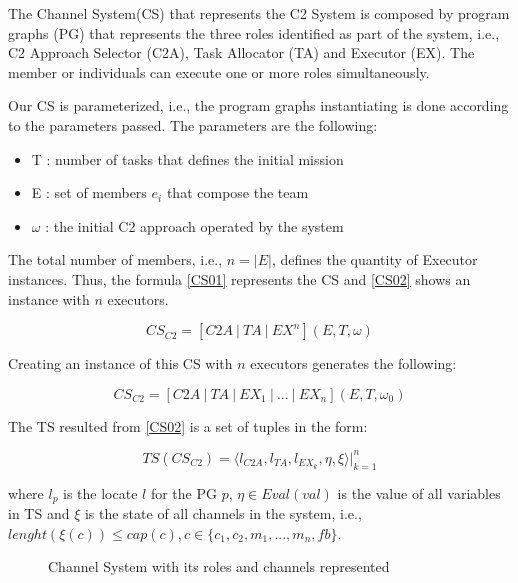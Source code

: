 The Channel System(CS) that represents the C2 System is composed by program graphs (PG) that represents the three roles identified as part of the system, i.e., C2 Approach Selector (C2A), Task Allocator (TA) and Executor (EX). The member or individuals can execute one or more roles simultaneously.

Our CS is parameterized, i.e., the program graphs instantiating is done according to the parameters passed. The parameters are the following:
\begin{itemize}
    \item T : number of tasks that defines the initial mission
    \item E : set of members $e_i$ that compose the team
    \item $\omega$ : the initial C2 approach operated by the system
\end{itemize}

The total number of members, i.e., $n=|E|$, defines the quantity of Executor instances. Thus, the formula \ref{CS01} represents the CS and \ref{CS02} shows an instance with $n$ executors.

\begin{equation}
\label{CS01}
    CS_{C2} = [C2A\ |\ TA\ |\ EX^n](E, T, \omega)
\end{equation}

Creating an instance of this CS with $n$ executors generates the following:

\begin{equation}
\label{CS02}
    CS_{C2} = [C2A\ |\ TA\ |\ EX_1\ |\ ...\ |\ EX_n](E, T, \omega_0)
\end{equation}

The TS resulted from \ref{CS02} is a set of tuples in the form:

\begin{equation}
\label{CS02}
    TS(CS_{C2})=\langle l_{C2A}, l_{TA}, l_{EX_k}, \eta, \xi \rangle |_{k=1}^n
\end{equation}

where $l_p$ is the locate $l$ for the PG $p$, $\eta \in Eval(val)$ is the value of all variables in TS and $\xi$ is the state of all channels in the system, i.e., $lenght(\xi(c)) \leq cap(c), c \in \{c_1, c_2, m_1, ..., m_n, fb\}$.

\begin{figure}[h]
\centering
\label{cs01}
\scalebox{1}{}
\caption{Channel System with its roles and channels represented}
\end{figure}


